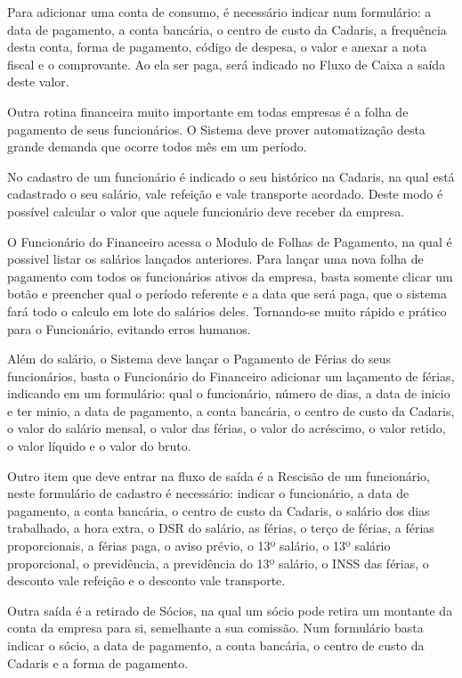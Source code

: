 \documentclass[
  12pt,				%
  openany,
  oneside,
  a4paper,			%
  english,			%
  brazil
]{article}
\numberwithin{figure}{section}
\numberwithin{table}{section}
\newcounter{subsubsubsection}[subsubsection]
\begin{document}
Para adicionar uma conta de consumo, é necessário indicar num formulário: a data de pagamento, a conta bancária, o centro de custo da Cadaris, a frequência desta conta, forma de pagamento, código de despesa, o valor e anexar a nota fiscal e o comprovante. Ao ela ser paga, será indicado no Fluxo de Caixa a saída deste valor.



Outra rotina financeira muito importante em todas empresas é a folha de pagamento de seus funcionários. O Sistema deve prover automatização desta grande demanda que ocorre todos mês em um período.

No cadastro de um funcionário é indicado o seu histórico na Cadaris, na qual está cadastrado o seu salário, vale refeição e vale transporte acordado. Deste modo é possível calcular o valor que aquele funcionário deve receber da empresa.

O Funcionário do Financeiro acessa o Modulo de Folhas de Pagamento, na qual é possivel listar os salários lançados anteriores. Para lançar uma nova folha de pagamento com todos os funcionários ativos da empresa, basta somente clicar um botão e preencher qual o período referente e a data que será paga, que o sistema fará todo o calculo em lote do salários deles. Tornando-se muito rápido e prático para o Funcionário, evitando erros humanos.

Além do salário, o Sistema deve lançar o Pagamento de Férias do seus funcionários, basta o Funcionário do Financeiro adicionar um laçamento de férias, indicando em um formulário: qual o funcionário, número de dias, a data de inicio e ter minio, a data de pagamento, a conta bancária, o centro de custo da Cadaris, o valor do salário mensal, o valor das férias, o valor do acréscimo, o valor retido, o valor líquido e o valor do bruto.

Outro item que deve entrar na fluxo de saída é a Rescisão de um funcionário, neste formulário de cadastro é necessário: indicar o funcionário, a data de pagamento, a conta bancária, o centro de custo da Cadaris, o salário dos dias trabalhado, a hora extra, o DSR do salário, as férias, o terço de férias, a férias proporcionais, a férias paga, o aviso prévio, o 13º salário, o 13º salário proporcional, o previdência, a previdência do 13º salário, o INSS das férias, o desconto vale refeição e o desconto vale transporte.

Outra saída é a retirado de Sócios, na qual um sócio pode retira um montante da conta da empresa para si, semelhante a sua comissão. Num formulário basta indicar o sócio, a data de pagamento, a conta bancária, o centro de custo da Cadaris e a forma de pagamento.
\end{document}
